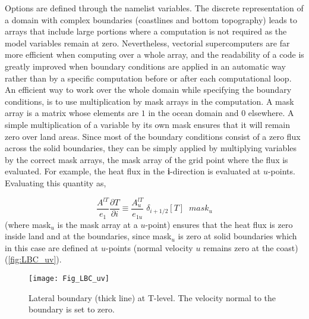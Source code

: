 \documentclass[../main/NEMO_manual]{subfiles}
\begin{document}
Options are defined through the  namelist variables.
The discrete representation of a domain with complex boundaries (coastlines and bottom topography) leads to
arrays that include large portions where a computation is not required as the model variables remain at zero.
Nevertheless, vectorial supercomputers are far more efficient when computing over a whole array,
and the readability of a code is greatly improved when boundary conditions are applied in
an automatic way rather than by a specific computation before or after each computational loop.
An efficient way to work over the whole domain while specifying the boundary conditions,
is to use multiplication by mask arrays in the computation.
A mask array is a matrix whose elements are $1$ in the ocean domain and $0$ elsewhere.
A simple multiplication of a variable by its own mask ensures that it will remain zero over land areas.
Since most of the boundary conditions consist of a zero flux across the solid boundaries,
they can be simply applied by multiplying variables by the correct mask arrays,
\ie the mask array of the grid point where the flux is evaluated.
For example, the heat flux in the \textbf{i}-direction is evaluated at $u$-points.
Evaluating this quantity as,

\[
  \frac{A^{lT} }{e_1 }\frac{\partial T}{\partial i}\equiv \frac{A_u^{lT}
  }{e_{1u} } \; \delta_{i+1 / 2} \left[ T \right]\;\;mask_u
\]
(where mask$_{u}$ is the mask array at a $u$-point) ensures that the heat flux is zero inside land and
at the boundaries, since mask$_{u}$ is zero at solid boundaries which in this case are defined at $u$-points
(normal velocity $u$ remains zero at the coast) (\autoref{fig:LBC_uv}). 

\begin{figure}[!t]
  \begin{center}
    \texttt{[image: Fig\_LBC\_uv]}
    \caption{
      \protect\label{fig:LBC_uv}
      Lateral boundary (thick line) at T-level.
      The velocity normal to the boundary is set to zero.
    }
  \end{center}
\end{figure}
\end{document}
